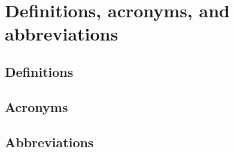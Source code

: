 \section{Definitions, acronyms, and abbreviations}

\subsection{Definitions}
\subsection{Acronyms}
\subsection{Abbreviations}